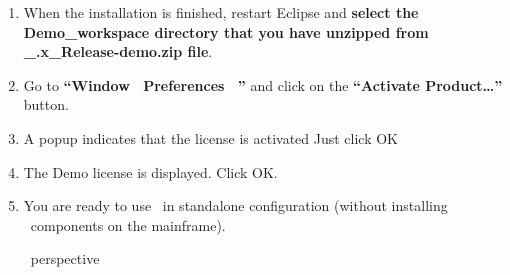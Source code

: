 \begin{enumerate}
\item When the installation is finished, restart Eclipse and \textbf{select the Demo\_workspace directory that you have unzipped from \mxproduct\_\mxversion.x\_Release-demo.zip file}.

\item Go to \textbf{``Window \RHD~Preferences \RHD~\mxproduct''} and click on the \textbf{``Activate Product\dots''} button.

\item A popup indicates that the license is activated
Just click OK

\item The Demo license is displayed.
Click OK.

\item You are ready to use \mxproduct~in standalone configuration (without installing \mxproduct~components on the mainframe).
\begin{center}
\mxproduct~perspective
\end{center}

\end{enumerate}

